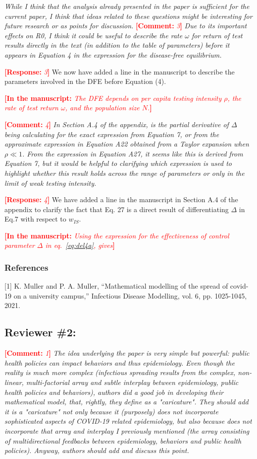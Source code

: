 \documentclass[12pt]{article}
\newcommand{\comment}{\showcomment}
\newcommand{\showcomment}[3]{\textcolor{#1}{\textbf{[#2: }\textsl{#3}\textbf{]}}}
\newcommand{\percap}{\emph{per capita}\xspace}
\DeclareRobustCommand\_{\ifmmode\expandafter\subtxt\else\textunderscore\fi}
\newcommand{\com}[1]{\comment{red}{Comment}{#1}} %
\newcommand{\res}[1]{\comment{red}{Response}{#1}} %
\newcommand{\rev}[1]{\comment{red}{In the manuscript}{#1}} %
\begin{document}
{\it While I think that the analysis already presented in the paper is sufficient for the current paper, I think that ideas related to these questions might be interesting for future research or as points for discussion.}
\com 3 
{\it Due to its important effects on R0, I think it could be useful to describe the rate $\omega$ for return of test results directly in the text (in addition to the table of parameters) before it appears in Equation 4 in the expression for the disease-free equilibrium.}
 
\res 3
We now have added a line in the manuscript to describe the parameters involved in the DFE before Equation (4).

\rev {The DFE depends on \percap testing intensity $\rho$, the rate of test return $\omega$, and the population size $N$.}

\com 4
{\it In Section A.4 of the appendix, is the partial derivative of $\Delta$ being calculating for the exact expression from Equation 7, or from the approximate expression in Equation A22 obtained from a Taylor expansion when $\rho \ll 1$. From the expression in Equation A27, it seems like this is derived from Equation 7, but it would be helpful to clarifying which expression is used to highlight whether this result holds across the range of parameters or only in the limit of weak testing intensity.}

\res 4
We have added a line in the manuscript in Section A.4 of the appendix to clarify the fact that Eq. 27 is a direct result of differentiating $\Delta$ in Eq.7 with respect to $w_{IS}$.

\rev{Using the expression for the effectiveness of control parameter $\Delta$ in eq.~\ref{eq:del4a}, gives}

\subsubsection*{References}

[1] K. Muller and P. A. Muller, ``Mathematical modelling of the spread of covid-19 on a university campus,'' Infectious Disease Modelling, vol. 6, pp. 1025-1045, 2021.


\subsection*{Reviewer \#2:}
\com 1 
{\it The idea underlying the paper is very simple but powerful: public health policies can impact behaviors and thus epidemiology. Even though the reality is much more complex (infectious spreading results from the complex, non-linear, multi-factorial array and subtle interplay between epidemiology, public health policies and behaviors), authors did a good job in developing their mathematical model, that, rightly, they define as a "caricature". They should add it is a "caricature" not only because it (purposely) does not incorporate sophisticated aspects of COVID-19 related epidemiology, but also because does not incorporate that array and interplay I previously mentioned (the array consisting of multidirectional feedbacks between epidemiology, behaviors and public health policies). Anyway, authors should add and discuss this point.}
\end{document}
